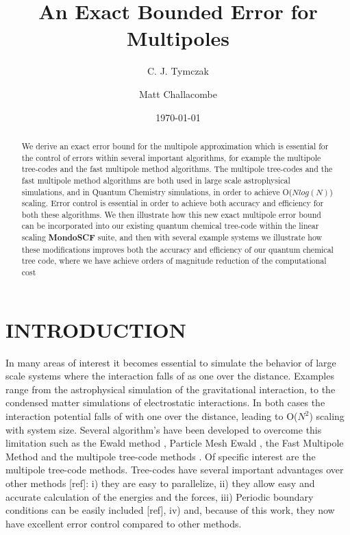 \documentclass[prb,aps,nobibnotes,superbib,preprint]{revtex4}
\begin{document}
\title{\textbf{An Exact Bounded Error for Multipoles}}

\author{C. J. Tymczak}
\author{Matt Challacombe}


\date{\today}

\begin{abstract}
We derive an exact error bound for the multipole approximation which is essential for the control of
errors within several important algorithms, for example the multipole tree-codes 
and the fast multipole method algorithms. 
%
The multipole tree-codes and the fast multipole method algorithms are both used in large scale astrophysical 
simulations, and in Quantum Chemistry simulations, in order to achieve {\cal O}($N log(N)$) 
scaling. 
%
Error control is essential in order to achieve both  accuracy and efficiency for both these algorithms. 
%
We then illustrate how this new exact multipole error bound can be incorporated into our existing 
quantum chemical tree-code within the linear scaling {\bf MondoSCF} suite,  
and then with several example systems we illustrate how these modifications improves both the accuracy and 
efficiency of our quantum chemical tree code, where we have achieve orders of magnitude reduction of the
computational cost
\end{abstract}


\maketitle

\section{INTRODUCTION}

In many areas of interest it becomes essential to simulate 
the behavior of large scale systems where the interaction 
falls of as one over the distance. Examples range from  the astrophysical simulation
of the gravitational interaction, to the condensed matter simulations of electrostatic interactions. 
In both cases the interaction potential falls of with one over the distance, 
leading to  {\cal O}($N^2$) scaling with system size. Several algorithm's have been developed to
overcome this limitation such as the Ewald method \cite{DFincham94}, 
Particle Mesh Ewald \cite{luty:94}, 
the Fast Multipole Method \cite{Singh93,shimada:94,singer:95a}
and the multipole tree-code methods \cite{Salmon94}. 
Of specific interest are the multipole tree-code methods. 
Tree-codes have several important advantages over other methods [ref]: i) they are easy to parallelize,
ii) they allow easy and accurate calculation of the energies and the forces, iii) Periodic boundary
conditions can be easily included [ref], iv) and, because of this work, they
now have excellent error control compared to other methods.
\end{document}
